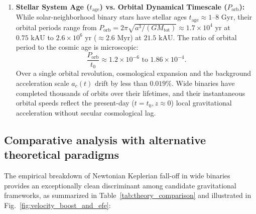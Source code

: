 \documentclass[aps,prd,reprint,superscriptaddress,nofootinbib,floatfix,amsmath,amssymb]{revtex4-2}
\begin{document}
\begin{enumerate}
\item \textbf{Stellar System Age ($t_{\text{age}}$) vs. Orbital Dynamical Timescale ($P_{\text{orb}}$):} While solar-neighborhood binary stars have stellar ages $t_{\text{age}} \approx 1\text{--}8\text{ Gyr}$, their orbital periods range from $P_{\text{orb}} = 2\pi \sqrt{a^3 / (G M_{\text{tot}})} \approx 1.7 \times 10^4\text{ yr}$ at $0.75\text{ kAU}$ to $2.6 \times 10^6\text{ yr}$ ($\approx 2.6\text{ Myr}$) at $21.5\text{ kAU}$. The ratio of orbital period to the cosmic age is microscopic:
\begin{equation}
\frac{P_{\text{orb}}}{t_0} \approx 1.2 \times 10^{-6} \text{ to } 1.86 \times 10^{-4}.
\end{equation}
Over a single orbital revolution, cosmological expansion and the background acceleration scale $a_c(t)$ drift by less than $0.019\%$. Wide binaries have completed thousands of orbits over their lifetimes, and their instantaneous orbital speeds reflect the present-day ($t = t_0, z \approx 0$) local gravitational acceleration without secular cosmological lag.
\end{enumerate}

\subsection{Comparative analysis with alternative theoretical paradigms}
\label{subsec:theory_comparisons}

The empirical breakdown of Newtonian Keplerian fall-off in wide binaries provides an exceptionally clean discriminant among candidate gravitational frameworks, as summarized in Table~\ref{tab:theory_comparison} and illustrated in Fig.~\ref{fig:velocity_boost_and_efe}:
\end{document}
